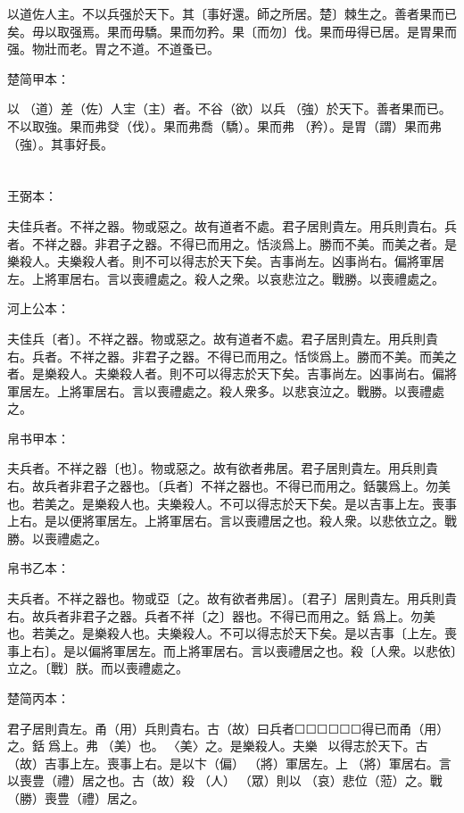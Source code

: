 \documentclass[a5paper]{ctexbook}
\begin{document}
    以道佐人主。不以兵强於天下。其〔事好還。師之所居。楚〕棘生之。善者果而已矣。毋以取强焉。果而毋驕。果而勿矜。果〔而勿〕伐。果而毋得已居。是胃果而强。物壯而老。胃之不道。不道蚤已。

    楚简甲本：

    以𧗟（道）差（佐）人宔（主）者。不谷（欲）以兵󶴘（強）於天下。善者果而已。不以取強。果而弗癹（伐）。果而弗喬（驕）。果而弗󶴙（矜）。是胃（謂）果而弗󶴘（強）。其事好長。

    \chapter{}
    王弼本：

    夫佳兵者。不祥之器。物或惡之。故有道者不處。君子居則貴左。用兵則貴右。兵者。不祥之器。非君子之器。不得已而用之。恬淡爲上。勝而不美。而美之者。是樂殺人。夫樂殺人者。則不可以得志於天下矣。吉事尚左。凶事尚右。偏將軍居左。上將軍居右。言以喪禮處之。殺人之衆。以哀悲泣之。戰勝。以喪禮處之。

    河上公本：

    夫佳兵〔者〕。不祥之器。物或惡之。故有道者不處。君子居則貴左。用兵則貴右。兵者。不祥之器。非君子之器。不得已而用之。恬惔爲上。勝而不美。而美之者。是樂殺人。夫樂殺人者。則不可以得志於天下矣。吉事尚左。凶事尚右。偏將軍居左。上將軍居右。言以喪禮處之。殺人衆多。以悲哀泣之。戰勝。以喪禮處之。

    帛书甲本：

    夫兵者。不祥之器〔也〕。物或惡之。故有欲者弗居。君子居則貴左。用兵則貴右。故兵者非君子之器也。〔兵者〕不祥之器也。不得已而用之。銛襲爲上。勿美也。若美之。是樂殺人也。夫樂殺人。不可以得志於天下矣。是以吉事上左。喪事上右。是以便將軍居左。上將軍居右。言以喪禮居之也。殺人衆。以悲依立之。戰勝。以喪禮處之。

    帛书乙本：

    夫兵者。不祥之器也。物或亞〔之。故有欲者弗居〕。〔君子〕居則貴左。用兵則貴右。故兵者非君子之器。兵者不祥〔之〕器也。不得已而用之。銛𢤱爲上。勿美也。若美之。是樂殺人也。夫樂殺人。不可以得志於天下矣。是以吉事〔上左。喪事上右〕。是以偏將軍居左。而上將軍居右。言以喪禮居之也。殺〔人衆。以悲依〕立之。〔戰〕朕。而以喪禮處之。

    楚简丙本：

    君子居則貴左。甬（用）兵則貴右。古（故）曰兵者☐☐☐☐☐☐得已而甬（用）之。銛󶵩爲上。弗󶴴（美）也。󶵪〈美〉之。是樂殺人。夫樂☐☐☐以得志於天下。古（故）吉事上左。喪事上右。是以卞（偏）𨟻（將）軍居左。上𨟻（將）軍居右。言以喪豊（禮）居之也。古（故）殺☐（人）☐（眾）則以𢙇（哀）悲位（蒞）之。戰󼡲（勝）喪豊（禮）居之。
\end{document}
